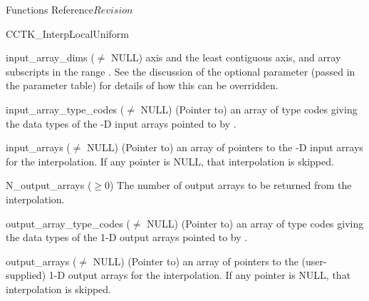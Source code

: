 \begin{cactuspart}{ Functions Reference}{}{$Revision$}
\begin{FunctionDescription}{CCTK\_InterpLocalUniform}
\begin{ParameterSection}
\begin{Parameter}{input\_array\_dims ($\ne$ NULL)}
axis and \code{[N\_dims-1]} the least contiguous axis, and array subscripts
in the range .  See the
discussion of the  optional parameter (passed
in the parameter table) for details of how this can be overridden.
\end{Parameter}
\begin{Parameter}{input\_array\_type\_codes ($\ne$ NULL)}
\mbox{}
(Pointer to) an array of  
type codes giving the data types of the -D input arrays
pointed to by .
\end{Parameter}
\begin{Parameter}{input\_arrays ($\ne$ NULL)}
\mbox{}
(Pointer to) an array of  pointers to the
-D input arrays for the interpolation.  If any
 pointer is NULL, that interpolation is skipped.
\end{Parameter}
\begin{Parameter}{N\_output\_arrays ($\ge 0$)}
\mbox{}
The number of output arrays to be returned from the interpolation.
\end{Parameter}
\begin{Parameter}{output\_array\_type\_codes ($\ne$ NULL)}
\mbox{}
(Pointer to) an array of  
type codes giving the data types of the 1-D output arrays pointed to by
.
\end{Parameter}
\begin{Parameter}{output\_arrays ($\ne$ NULL)}
\mbox{}
(Pointer to) an array of  pointers to the
(user-supplied) 1-D output arrays for the interpolation.  If any
 pointer is NULL, that interpolation is skipped.
\end{Parameter}
\end{ParameterSection}


\end{FunctionDescription}
\end{cactuspart}
